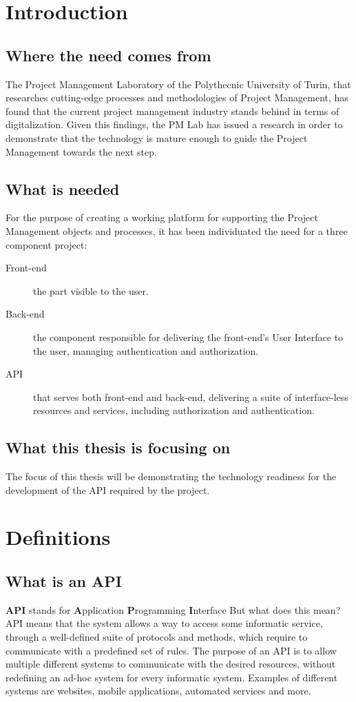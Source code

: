\documentclass[12pt]{report}
\begin{document}
\chapter{Introduction}

\section{Where the need comes from}
The Project Management Laboratory of the Polythecnic University of Turin, that researches cutting-edge processes and methodologies of Project Management, has found that the current project management industry stands behind in terms of digitalization. Given this findings, the PM Lab has issued a research in order to demonstrate that the technology is mature enough to guide the Project Management towards the next step.

\section{What is needed}
For the purpose of creating a working platform for supporting the Project Management objects and processes, it has been individuated the need for a three component project:
\begin{description}
   \item[Front-end] the part visible to the user.
   \item[Back-end] the component responsible for delivering the front-end's User Interface to the user, managing authentication and authorization.
   \item[API] that serves both front-end and back-end, delivering a suite of interface-less resources and services, including authorization and authentication.
\end{description}

\section{What this thesis is focusing on}
The focus of this thesis will be demonstrating the technology readiness for the development of the API required by the project.



\chapter{Definitions}

\section{What is an API}
\textbf{API} stands for \textbf{A}pplication \textbf{P}rogramming \textbf{I}nterface
\newline
But what does this mean?
API means that the system allows a way to access some informatic service, through a well-defined suite of protocols and methods, which require to communicate with a predefined set of rules.
\newline
The purpose of an API is to allow multiple different systems to communicate with the desired resources, without redefining an ad-hoc system for every informatic system. Examples of different systems are websites, mobile applications, automated services and more.
\end{document}
